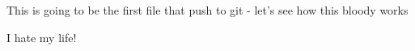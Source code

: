 This is going to be the first file that push to git - let's see how this bloody works 

I hate my life! 

